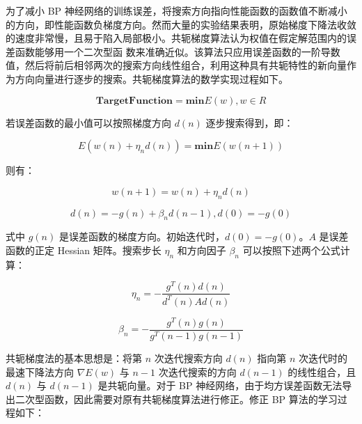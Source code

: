 \documentclass[UTF8]{ctexart}
\begin{document}
为了减小 BP 神经网络的训练误差，将搜索方向指向性能函数的函数值不断减小的方向，即性能函数负梯度方向。然而大量的实验结果表明，原始梯度下降法收敛的速度非常慢，且易于陷入局部极小。共轭梯度算法认为权值在假定解范围内的误差函数能够用一个二次型函
数来准确近似。该算法只应用误差函数的一阶导数值，然后将前后相邻两次的搜索方向线性组合，利用这种具有共轭特性的新向量作为方向向量进行逐步的搜索。共轭梯度算法的数学实现过程如下。 \par

\begin{equation}
\mathbf{Target Function} = \mathbf{min} E(w), w \in R
\end {equation}

若误差函数的最小值可以按照梯度方向 $d(n)$ 逐步搜索得到，即： \par

\begin{equation}
E(w(n) + \eta_{n}d(n)) = \mathbf{min} E(w(n+1))
\end {equation}

则有： \par

\begin{equation}
w(n+1) = w(n) + \eta_{n}d(n)
\end {equation}

\begin{equation}
d(n) = -g(n) + \beta_n d(n-1), d(0) = -g(0)
\end {equation}

式中 $g(n)$ 是误差函数的梯度方向。初始迭代时，$d(0)=-g(0)$。$A$ 是误差函数的正定 Hessian 矩阵。搜索步长 $\eta_n$ 和方向因子 $\beta_n$ 可以按照下述两个公式计算： \par

\begin{equation}
\eta_{n} = - \frac{g^{T}(n) d(n)}{d^{T}(n) Ad(n)}
\end {equation}

\begin{equation}
\beta_{n} = - \frac{g^{T}(n) g(n)}{g^{T}(n-1) g(n-1)}
\end {equation}

共轭梯度法的基本思想是：将第  $n$ 次迭代搜索方向 $d(n)$ 指向第 $n$ 次迭代时的最速下降法方向 $\nabla E(w)$ 与 $n-1$ 次迭代搜索的方向 $d(n-1)$ 的线性组合，且 $d(n)$ 与 $d(n-1)$ 是共轭向量。对于 BP 神经网络，由于均方误差函数无法导出二次型函数，因此需要对原有共轭梯度算法进行修正。修正 BP 算法的学习过程如下： \par
\end{document}
